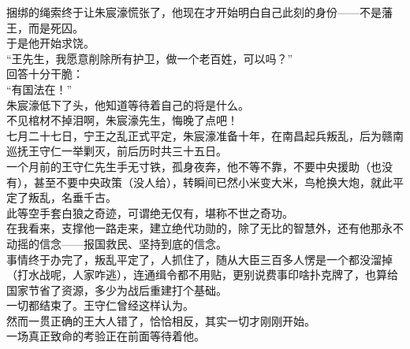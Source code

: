 \begin{multicols}{\theparacolNo}
捆绑的绳索终于让朱宸濠慌张了，他现在才开始明白自己此刻的身份——不是藩王，而是死囚。\\

于是他开始求饶。\\

“王先生，我愿意削除所有护卫，做一个老百姓，可以吗？”\\

回答十分干脆：\\

“有国法在！”\\

朱宸濠低下了头，他知道等待着自己的将是什么。\\

不见棺材不掉泪啊，朱宸濠先生，悔晚了点吧！\\

七月二十七日，宁王之乱正式平定，朱宸濠准备十年，在南昌起兵叛乱，后为赣南巡抚王守仁一举剿灭，前后历时共三十五日。\\

一个月前的王守仁先生手无寸铁，孤身夜奔，他不等不靠，不要中央援助（也没有），甚至不要中央政策（没人给），转瞬间已然小米变大米，鸟枪换大炮，就此平定了叛乱，名垂千古。\\

此等空手套白狼之奇迹，可谓绝无仅有，堪称不世之奇功。\\

在我看来，支撑他一路走来，建立绝代功勋的，除了无比的智慧外，还有他那永不动摇的信念——报国救民、坚持到底的信念。\\

事情终于办完了，叛乱平定了，人抓住了，随从大臣三百多人愣是一个都没溜掉（打水战呢，人家咋逃），连通缉令都不用贴，更别说费事印啥扑克牌了，也算给国家节省了资源，多少为战后重建打个基础。\\

一切都结束了。王守仁曾经这样认为。\\

然而一贯正确的王大人错了，恰恰相反，其实一切才刚刚开始。\\

一场真正致命的考验正在前面等待着他。\\
\ifnum{}
	\end{multicols}
\fi
\newpage
